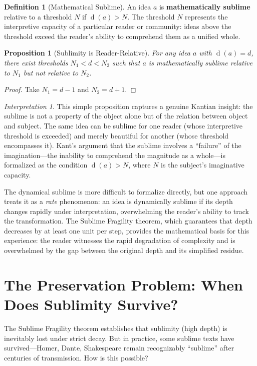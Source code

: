 \documentclass[11pt,openany]{book}
\theoremstyle{definition}
\newtheorem{definition}[axiom]{Definition}
\theoremstyle{plain}
\newtheorem{proposition}[axiom]{Proposition}
\theoremstyle{remark}
\newtheorem{interpretation}[axiom]{Interpretation}
\newcommand{\depth}{\operatorname{d}}       %
\begin{document}
\begin{definition}[Mathematical Sublime]
An idea $a$ is \textbf{mathematically sublime} relative to a threshold $N$ if $\depth(a) > N$. The threshold $N$ represents the interpretive capacity of a particular reader or community: ideas above the threshold exceed the reader's ability to comprehend them as a unified whole.
\end{definition}

\begin{proposition}[Sublimity is Reader-Relative]
For any idea $a$ with $\depth(a) = d$, there exist thresholds $N_1 < d < N_2$ such that $a$ is mathematically sublime relative to $N_1$ but not relative to $N_2$.
\end{proposition}

\begin{proof}
Take $N_1 = d - 1$ and $N_2 = d + 1$.
\end{proof}

\begin{interpretation}
This simple proposition captures a genuine Kantian insight: the sublime is not a property of the object alone but of the relation between object and subject. The same idea can be sublime for one reader (whose interpretive threshold is exceeded) and merely beautiful for another (whose threshold encompasses it). Kant's argument that the sublime involves a ``failure'' of the imagination---the inability to comprehend the magnitude as a whole---is formalized as the condition $\depth(a) > N$, where $N$ is the subject's imaginative capacity.

The dynamical sublime is more difficult to formalize directly, but one approach treats it as a \emph{rate} phenomenon: an idea is dynamically sublime if its depth changes rapidly under interpretation, overwhelming the reader's ability to track the transformation. The Sublime Fragility theorem, which guarantees that depth decreases by at least one unit per step, provides the mathematical basis for this experience: the reader witnesses the rapid degradation of complexity and is overwhelmed by the gap between the original depth and its simplified residue.
\end{interpretation}

\section{The Preservation Problem: When Does Sublimity Survive?}

The Sublime Fragility theorem establishes that sublimity (high depth) is inevitably lost under strict decay. But in practice, some sublime texts have survived---Homer, Dante, Shakespeare remain recognizably ``sublime'' after centuries of transmission. How is this possible?
\end{document}
